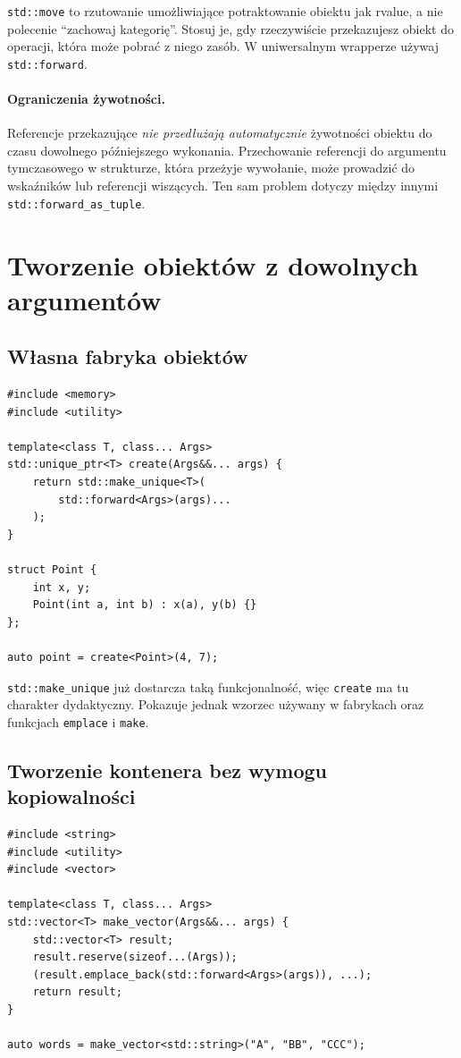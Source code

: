 \texttt{std::move} to rzutowanie umożliwiające potraktowanie
obiektu jak rvalue, a nie polecenie ``zachowaj kategorię''.
Stosuj je, gdy rzeczywiście przekazujesz obiekt do operacji,
która może pobrać z niego zasób. W uniwersalnym wrapperze
używaj \texttt{std::forward}.

\paragraph{Ograniczenia żywotności.}
Referencje przekazujące \emph{nie przedłużają automatycznie}
żywotności obiektu do czasu dowolnego późniejszego wykonania.
Przechowanie referencji do argumentu tymczasowego w strukturze,
która przeżyje wywołanie, może prowadzić do wskaźników lub
referencji wiszących. Ten sam problem dotyczy między innymi
\texttt{std::forward\_as\_tuple}.

\section{Tworzenie obiektów z dowolnych argumentów}
\label{sec:variadic-emplace}

\subsection{Własna fabryka obiektów}

\begin{lstlisting}
#include <memory>
#include <utility>

template<class T, class... Args>
std::unique_ptr<T> create(Args&&... args) {
    return std::make_unique<T>(
        std::forward<Args>(args)...
    );
}

struct Point {
    int x, y;
    Point(int a, int b) : x(a), y(b) {}
};

auto point = create<Point>(4, 7);
\end{lstlisting}

\texttt{std::make\_unique} już dostarcza taką funkcjonalność,
więc \texttt{create} ma tu charakter dydaktyczny. Pokazuje
jednak wzorzec używany w fabrykach oraz funkcjach
\texttt{emplace} i \texttt{make}.

\subsection{Tworzenie kontenera bez wymogu kopiowalności}

\begin{lstlisting}
#include <string>
#include <utility>
#include <vector>

template<class T, class... Args>
std::vector<T> make_vector(Args&&... args) {
    std::vector<T> result;
    result.reserve(sizeof...(Args));
    (result.emplace_back(std::forward<Args>(args)), ...);
    return result;
}

auto words = make_vector<std::string>("A", "BB", "CCC");
\end{lstlisting}

